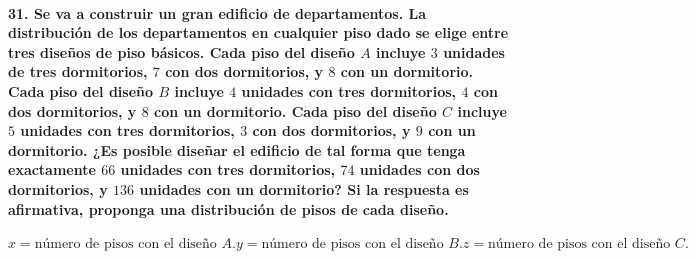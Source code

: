 \documentclass[
]{article}
\begin{document}
{\paragraph{\texorpdfstring{31. Se va a construir un gran edificio de
departamentos. La distribución de los departamentos en cualquier piso
dado se elige entre tres diseños de piso básicos. Cada piso del diseño
\(A\) incluye \(3\) unidades de tres dormitorios, \(7\) con dos
dormitorios, y \(8\) con un dormitorio. Cada piso del diseño \(B\)
incluye \(4\) unidades con tres dormitorios, \(4\) con dos dormitorios,
y \(8\) con un dormitorio. Cada piso del diseño \(C\) incluye \(5\)
unidades con tres dormitorios, \(3\) con dos dormitorios, y \(9\) con un
dormitorio. ¿Es posible diseñar el edificio de tal forma que tenga
exactamente \(66\) unidades con tres dormitorios, \(74\) unidades con
dos dormitorios, y \(136\) unidades con un dormitorio? Si la respuesta
es afirmativa, proponga una distribución de pisos de cada
diseño.}{31. Se va a construir un gran edificio de departamentos. La distribución de los departamentos en cualquier piso dado se elige entre tres diseños de piso básicos. Cada piso del diseño A incluye 3 unidades de tres dormitorios, 7 con dos dormitorios, y 8 con un dormitorio. Cada piso del diseño B incluye 4 unidades con tres dormitorios, 4 con dos dormitorios, y 8 con un dormitorio. Cada piso del diseño C incluye 5 unidades con tres dormitorios, 3 con dos dormitorios, y 9 con un dormitorio. ¿Es posible diseñar el edificio de tal forma que tenga exactamente 66 unidades con tres dormitorios, 74 unidades con dos dormitorios, y 136 unidades con un dormitorio? Si la respuesta es afirmativa, proponga una distribución de pisos de cada diseño.}}\label{se-va-a-construir-un-gran-edificio-de-departamentos.-la-distribuciuxf3n-de-los-departamentos-en-cualquier-piso-dado-se-elige-entre-tres-diseuxf1os-de-piso-buxe1sicos.-cada-piso-del-diseuxf1o-a-incluye-3-unidades-de-tres-dormitorios-7-con-dos-dormitorios-y-8-con-un-dormitorio.-cada-piso-del-diseuxf1o-b-incluye-4-unidades-con-tres-dormitorios-4-con-dos-dormitorios-y-8-con-un-dormitorio.-cada-piso-del-diseuxf1o-c-incluye-5-unidades-con-tres-dormitorios-3-con-dos-dormitorios-y-9-con-un-dormitorio.-es-posible-diseuxf1ar-el-edificio-de-tal-forma-que-tenga-exactamente-66-unidades-con-tres-dormitorios-74-unidades-con-dos-dormitorios-y-136-unidades-con-un-dormitorio-si-la-respuesta-es-afirmativa-proponga-una-distribuciuxf3n-de-pisos-de-cada-diseuxf1o.}}

\[
x = \text{número de pisos con el diseño } A.
y = \text{número de pisos con el diseño } B.
z = \text{número de pisos con el diseño } C.
\]
\end{document}
